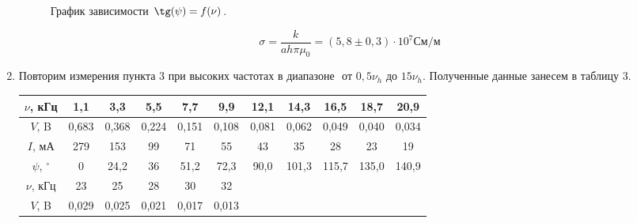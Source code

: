 \documentclass[a4paper, 12pt]{article}%
\begin{document}
\begin{enumerate}
	\begin{figure}[H]
		\caption{График зависимости $\tg(\psi) = f(\nu)$.}
	\end{figure}

	$$ \sigma = \frac{k}{ah\pi\mu_0} = (5,8 \pm 0,3)\cdot 10^7 \text{См/м}$$
	
	\newpage
		
	\item Повторим измерения пункта 3 при высоких частотах в диапазоне $ \text{ от } 0,5\nu_h \text{ до } 15\nu_h$. Полученные данные занесем в таблицу 3.
	
	\begin{longtable} {|c|c|c|c|c|c|c|c|c|c|c|}
		\hline
		$\nu$, кГц& 1,1 & 3,3 & 5,5 & 7,7 & 9,9 & 12,1 & 14,3 & 16,5 & 18,7 & 20,9  \\ \hline
		
		$V$, B & 0,683 & 0,368 & 0,224 & 0,151 & 0,108 & 0,081 & 0,062 & 0,049 & 0,040 & 0,034 \\ \hline
		
		$I$, мА& 279 & 153 & 99 & 71 & 55 & 43 & 35 & 28 & 23 & 19  \\ \hline
		
		$\psi$, $^\circ$ & 0 & 24,2 & 36 & 51,2 & 72,3 & 90,0 & 101,3 & 115,7 & 135,0 & 140,9  \\ \hline
		
		\hline
		\hline
		
		$\nu$, кГц & 23 & 25 & 28 & 30 & 32 &  &  &  &  &    \\ \hline
		
		$V$, B  & 0,029 & 0,025 & 0,021 & 0,017 & 0,013 &  &  &  &  &   \\ \hline
		

\end{longtable}
\end{enumerate}
\end{document}
